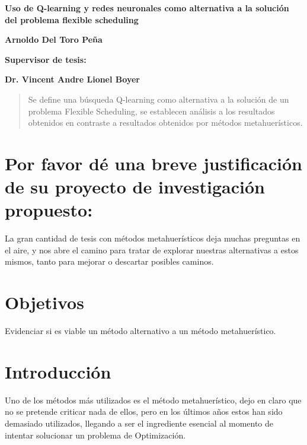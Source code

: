 \documentclass[letterpaper, 10 pt]{article}
\newcommand{\Tittle}[1]{ {\Huge \bfseries{ #1 }}  }
\newcommand{\subTittle}[1]{ {\Large \bfseries{ #1 }}  }
\begin{document}
\sffamily %
\begin{center}

	\Tittle{Uso de Q-learning y redes neuronales como alternativa a la solución del problema flexible scheduling} \par
	\subTittle{Arnoldo Del Toro Peña}  \par
	\subTittle{Supervisor de tesis:} \par
	\subTittle{Dr. Vincent Andre Lionel}\textbf{\Large Boyer } 
\end{center}

\begin{abstract}
	Se define una búsqueda Q-learning como alternativa a la solución de un problema Flexible Scheduling, se establecen análisis a los resultados obtenidos en contraste a resultados obtenidos por métodos metahuerísticos.
\end{abstract}

\section*{Por favor dé una breve justificación de su proyecto de investigación propuesto:}
La gran cantidad de tesis con métodos metahuerísticos deja muchas preguntas en el aire, y nos abre el camino para tratar de explorar nuestras alternativas a estos mismos, tanto para mejorar o descartar posibles caminos.

\section*{Objetivos}
Evidenciar si es viable un método alternativo a un método metahuerístico.

\section*{Introducción}

Uno de los métodos más utilizados es el método metahuerístico, dejo en claro que no se pretende criticar nada de ellos, pero en los últimos años estos han sido demasiado utilizados, llegando a ser el ingrediente esencial al momento de intentar solucionar un problema de Optimización.
\end{document}
